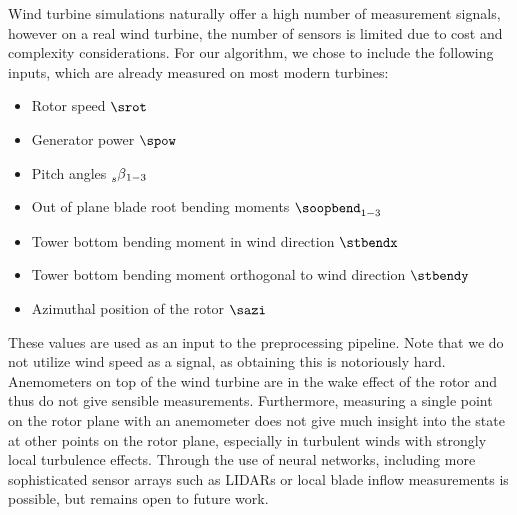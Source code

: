 Wind turbine simulations naturally offer a high number of measurement signals, however on a real wind turbine, the number of sensors is limited due to cost and complexity considerations. For our algorithm, we chose to include the following inputs, which are already measured on most modern turbines:
\begin{itemize}
  \item Rotor speed $\srot$
  \item Generator power $\spow$
  \item Pitch angles $\prescript{}{s}{\beta}_{1-3}$
  \item Out of plane blade root bending moments $\soopbend_{1-3}$
  \item Tower bottom bending moment in wind direction $\stbendx$  
  \item Tower bottom bending moment orthogonal to wind direction $\stbendy$
  \item Azimuthal position of the rotor $\sazi$
\end{itemize}

These values are used as an input to the preprocessing pipeline. Note that we do not utilize wind speed as a signal, as obtaining this is notoriously hard. Anemometers on top of the wind turbine are in the wake effect of the rotor and thus do not give sensible measurements. Furthermore, measuring a single point on the rotor plane with an anemometer does not give much insight into the state at other points on the rotor plane, especially in turbulent winds with strongly local turbulence effects. Through the use of neural networks, including more sophisticated sensor arrays such as LIDARs or local blade inflow measurements is possible, but remains open to future work. 

